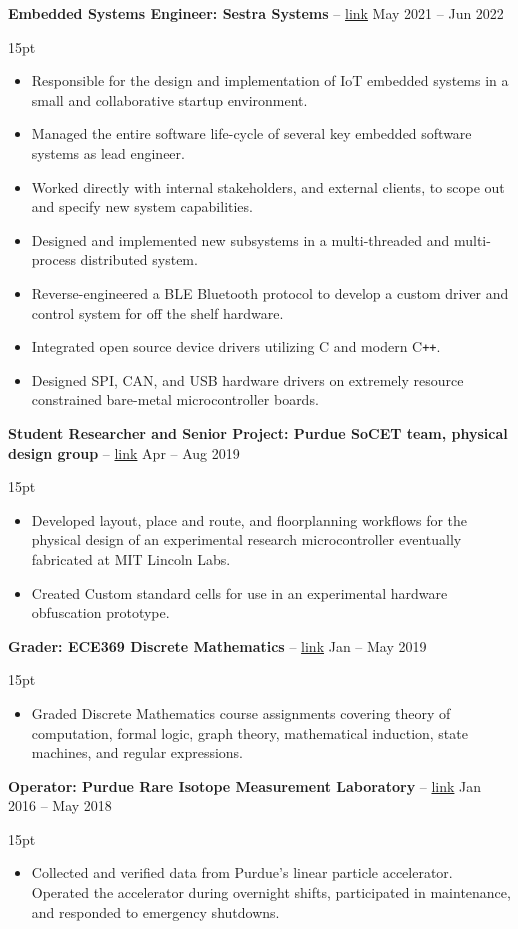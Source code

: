 \documentclass[10pt,letterpaper]{article}
\newcommand{\resumeItem}[4]{
	\begingroup
	\def\link{#2}
	\textbf{#1}
	\ifx\link\empty \else 
		-- \href{#2}{link}
	\fi
	\hfill #3\\
	\begin{adjustwidth}{15pt}{}
	#4
	\end{adjustwidth}
	\endgroup
}
\begin{document}
\resumeItem
{Embedded Systems Engineer: Sestra Systems}
{}
{May 2021 -- Jun 2022}
{
\begin{itemize}
	\item Responsible for the design and implementation of IoT embedded systems in a small and collaborative startup environment.
	\item Managed the entire software life-cycle of several key embedded software systems as lead engineer.
	\item Worked directly with internal stakeholders, and external clients, to scope out and specify new system capabilities.
	\item Designed and implemented new subsystems in a multi-threaded and multi-process distributed system.
	\item Reverse-engineered a BLE Bluetooth protocol to develop a custom driver and control system for off the shelf hardware.
	\item Integrated open source device drivers utilizing C and modern C\texttt{++}.
	\item Designed SPI, CAN, and USB hardware drivers on extremely resource constrained bare-metal microcontroller boards.
\end{itemize}
}

\resumeItem
{Student Researcher and Senior Project: Purdue SoCET team, physical design group}
{}
{Apr -- Aug 2019}
{
\begin{itemize}
	\item Developed layout, place and route, and floorplanning workflows for the physical design of an experimental research microcontroller eventually fabricated at MIT Lincoln Labs.
	\item Created Custom standard cells for use in an experimental hardware obfuscation prototype.
\end{itemize}
}

\resumeItem
{Grader: ECE369 Discrete Mathematics}
{}
{Jan -- May 2019}
{
\begin{itemize}
	\item Graded Discrete Mathematics course assignments covering theory of computation, formal logic, graph theory, mathematical induction, state machines, and regular expressions.
\end{itemize}
}

\resumeItem
{Operator: Purdue Rare Isotope Measurement Laboratory}
{}
{Jan 2016 -- May 2018}
{
\begin{itemize}
	\item Collected and verified data from Purdue's linear particle accelerator. Operated the accelerator during overnight shifts, participated in maintenance, and responded to emergency shutdowns.
\end{itemize}
}
\end{document}

